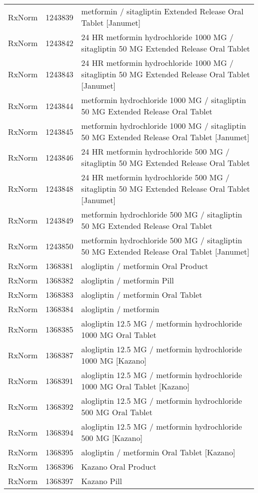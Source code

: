 \begin{longtable}{p{}p{}p{}}
  RxNorm & 1243839 & metformin / sitagliptin Extended Release Oral Tablet [Janumet] \\ 
  RxNorm & 1243842 & 24 HR metformin hydrochloride 1000 MG / sitagliptin 50 MG Extended Release Oral Tablet \\ 
  RxNorm & 1243843 & 24 HR metformin hydrochloride 1000 MG / sitagliptin 50 MG Extended Release Oral Tablet [Janumet] \\ 
  RxNorm & 1243844 & metformin hydrochloride 1000 MG / sitagliptin 50 MG Extended Release Oral Tablet \\ 
  RxNorm & 1243845 & metformin hydrochloride 1000 MG / sitagliptin 50 MG Extended Release Oral Tablet [Janumet] \\ 
  RxNorm & 1243846 & 24 HR metformin hydrochloride 500 MG / sitagliptin 50 MG Extended Release Oral Tablet \\ 
  RxNorm & 1243848 & 24 HR metformin hydrochloride 500 MG / sitagliptin 50 MG Extended Release Oral Tablet [Janumet] \\ 
  RxNorm & 1243849 & metformin hydrochloride 500 MG / sitagliptin 50 MG Extended Release Oral Tablet \\ 
  RxNorm & 1243850 & metformin hydrochloride 500 MG / sitagliptin 50 MG Extended Release Oral Tablet [Janumet] \\ 
  RxNorm & 1368381 & alogliptin / metformin Oral Product \\ 
  RxNorm & 1368382 & alogliptin / metformin Pill \\ 
  RxNorm & 1368383 & alogliptin / metformin Oral Tablet \\ 
  RxNorm & 1368384 & alogliptin / metformin \\ 
  RxNorm & 1368385 & alogliptin 12.5 MG / metformin hydrochloride 1000 MG Oral Tablet \\ 
  RxNorm & 1368387 & alogliptin 12.5 MG / metformin hydrochloride 1000 MG [Kazano] \\ 
  RxNorm & 1368391 & alogliptin 12.5 MG / metformin hydrochloride 1000 MG Oral Tablet [Kazano] \\ 
  RxNorm & 1368392 & alogliptin 12.5 MG / metformin hydrochloride 500 MG Oral Tablet \\ 
  RxNorm & 1368394 & alogliptin 12.5 MG / metformin hydrochloride 500 MG [Kazano] \\ 
  RxNorm & 1368395 & alogliptin / metformin Oral Tablet [Kazano] \\ 
  RxNorm & 1368396 & Kazano Oral Product \\ 
  RxNorm & 1368397 & Kazano Pill \\ 

\end{longtable}

